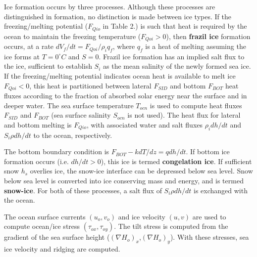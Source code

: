 Ice formation occurs by three processes. Although these processes are distinguished
in formation, no distinction is made between ice types. If the freezing/melting
potential ($F_{Qio}$ in Table 2.) is such that heat is required by the ocean to maintain 
the freezing temperature ($F_{Qoi}>0$), then {\bf{frazil ice}} formation occurs, at a 
rate $dV_f/dt = F_{Qoi} / \rho_i q_f$, where $q_f$ is a heat of melting assuming the
ice forms at $T=0^\circ C$ and $S=0$. Frazil ice formation has an implied salt 
flux to the ice, sufficient to establish $S_i$ as the mean salinity of the newly 
formed sea ice. If the freezing/melting potential indicates ocean heat is available 
to melt ice $F_{Qoi}<0$, this heat is partitioned between lateral $F_{SID}$ and bottom 
$F_{BOT}$ heat fluxes according to the fraction of absorbed solar energy near the 
surface and in deeper water. The sea surface temperature $T_{ocn}$ is used to compute heat 
fluxes $F_{SID}$ and $F_{BOT}$ (sea surface salinity $S_{ocn}$ is not used). The heat flux 
for lateral and bottom melting is $F_{Qio}$, with associated water and salt fluxes 
$\rho_i dh/dt$ and $S_i\rho dh/dt$ to the ocean, respectively.

The bottom boundary condition is
$F_{BOT} - k dT/dz = q dh/dt$. If bottom ice formation occurs (i.e. $dh/dt > 0$),
this ice is termed {\bf{congelation ice}}. If sufficient snow $h_s$ overlies 
ice, the snow-ice interface can be depressed below sea level. Snow below sea level 
is converted into ice conserving mass and energy, and is termed {\bf{snow-ice}}. For 
both of these processes, a salt flux of $S_i \rho dh/dt$ is exchanged with the ocean.

The ocean surface currents $(u_o,v_o)$ and ice velocity $(u,v)$ are used
to compute ocean/ice stress $(\tau_{ox},\tau_{oy})$. The tilt stress is computed 
from the gradient of the sea surface height ($(\nabla H_o)_x$,$(\nabla H_o)_y$).
With these stresses, sea ice velocity and ridging are computed.


